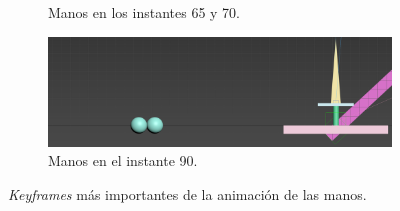 \begin{figure}[H]
\begin{subfigure}[t]{0.48\textwidth}
    \caption{Manos en los instantes 65 y 70.}
 \end{subfigure}
\hfill
 \begin{subfigure}[t]{0.48\textwidth}
    \centering
    \includegraphics[width=\textwidth]{imagenes/espada/keyframes/90.png}
    \caption{Manos en el instante 90.}
 \end{subfigure}
 \caption{\textit{Keyframes} más importantes de la animación de las manos.}
\end{figure}